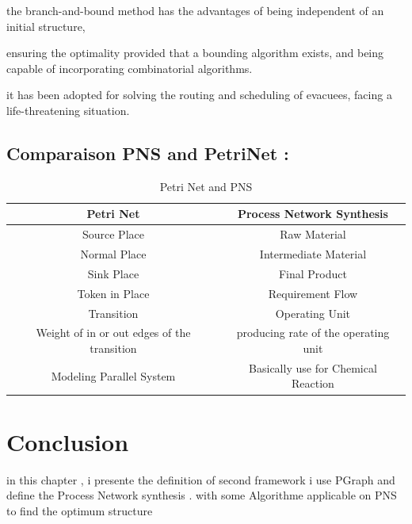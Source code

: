 the branch-and-bound method has the
advantages of being independent of an initial structure, 

ensuring the optimality
provided that a bounding algorithm exists, and being capable of incorporating
combinatorial algorithms.  \cite{algo}


it has been adopted for solving the routing and scheduling of evacuees, facing a life-threatening situation.  \cite{pns4}

\subsection{ Comparaison PNS and PetriNet : }
\begin {table}[H] 
\begin{tabular}{cc}

\hline 
\textbf{Petri Net}  & \textbf{Process Network Synthesis}\tabularnewline
\hline 
Source Place  & Raw Material\tabularnewline
Normal Place  & Intermediate Material\tabularnewline
Sink Place  & Final Product\tabularnewline
Token in Place  & Requirement Flow \tabularnewline
Transition  & Operating Unit \tabularnewline
Weight of in or out edges of the  transition & producing rate of the operating unit\tabularnewline
\hline 
Modeling Parallel System  & Basically use for Chemical Reaction \tabularnewline
\hline 

\end{tabular}
\caption {Petri Net and PNS}
 
\end {table}

\section{Conclusion}
in this chapter , i presente the definition of second framework i use
PGraph and define the Process Network synthesis .
with some Algorithme applicable on PNS
to find the optimum structure



